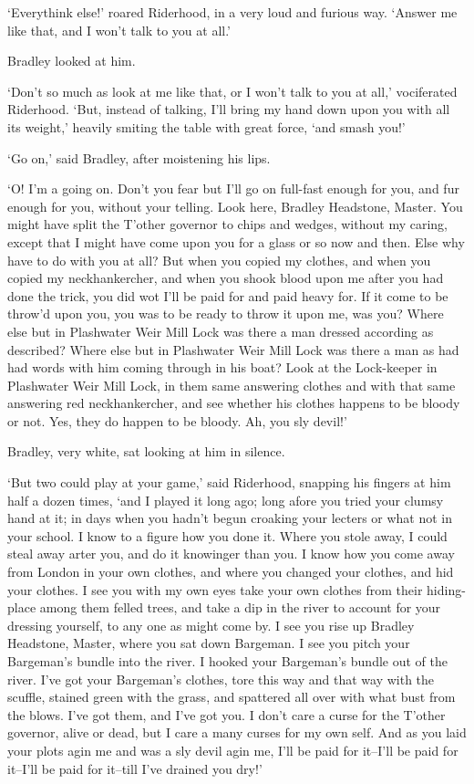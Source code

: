 ‘Everythink else!’ roared Riderhood, in a very loud and furious way.
‘Answer me like that, and I won’t talk to you at all.’

Bradley looked at him.

‘Don’t so much as look at me like that, or I won’t talk to you at all,’
vociferated Riderhood. ‘But, instead of talking, I’ll bring my hand
down upon you with all its weight,’ heavily smiting the table with great
force, ‘and smash you!’

‘Go on,’ said Bradley, after moistening his lips.

‘O! I’m a going on. Don’t you fear but I’ll go on full-fast enough for
you, and fur enough for you, without your telling. Look here, Bradley
Headstone, Master. You might have split the T’other governor to chips
and wedges, without my caring, except that I might have come upon you
for a glass or so now and then. Else why have to do with you at all? But
when you copied my clothes, and when you copied my neckhankercher, and
when you shook blood upon me after you had done the trick, you did wot
I’ll be paid for and paid heavy for. If it come to be throw’d upon you,
you was to be ready to throw it upon me, was you? Where else but
in Plashwater Weir Mill Lock was there a man dressed according as
described? Where else but in Plashwater Weir Mill Lock was there a
man as had had words with him coming through in his boat? Look at the
Lock-keeper in Plashwater Weir Mill Lock, in them same answering clothes
and with that same answering red neckhankercher, and see whether his
clothes happens to be bloody or not. Yes, they do happen to be bloody.
Ah, you sly devil!’

Bradley, very white, sat looking at him in silence.

‘But two could play at your game,’ said Riderhood, snapping his fingers
at him half a dozen times, ‘and I played it long ago; long afore you
tried your clumsy hand at it; in days when you hadn’t begun croaking
your lecters or what not in your school. I know to a figure how you
done it. Where you stole away, I could steal away arter you, and do it
knowinger than you. I know how you come away from London in your own
clothes, and where you changed your clothes, and hid your clothes. I see
you with my own eyes take your own clothes from their hiding-place
among them felled trees, and take a dip in the river to account for
your dressing yourself, to any one as might come by. I see you rise up
Bradley Headstone, Master, where you sat down Bargeman. I see you pitch
your Bargeman’s bundle into the river. I hooked your Bargeman’s bundle
out of the river. I’ve got your Bargeman’s clothes, tore this way and
that way with the scuffle, stained green with the grass, and spattered
all over with what bust from the blows. I’ve got them, and I’ve got you.
I don’t care a curse for the T’other governor, alive or dead, but I care
a many curses for my own self. And as you laid your plots agin me and
was a sly devil agin me, I’ll be paid for it--I’ll be paid for it--I’ll
be paid for it--till I’ve drained you dry!’

